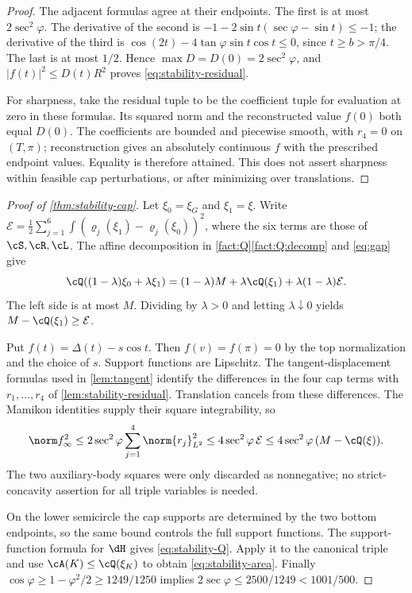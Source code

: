 \begin{proof}
The adjacent formulas agree at their endpoints. The first is at most
$2\sec^2\varphi$. The derivative of the second is
$-1-2\sin t(\sec\varphi-\sin t)\le-1$; the derivative of the third is
$\cos(2t)-4\tan\varphi\sin t\cos t\le0$, since $t\ge b>\pi/4$.
The last is at most $1/2$. Hence $\max D=D(0)=2\sec^2\varphi$, and
$|f(t)|^2\le D(t)R^2$ proves \eqref{eq:stability-residual}.

For sharpness, take the residual tuple to be the coefficient tuple for
evaluation at zero in these formulas. Its squared norm and the reconstructed
value $f(0)$ both equal $D(0)$. The coefficients are bounded and piecewise
smooth, with $r_4=0$ on $(T,\pi)$; reconstruction gives an absolutely
continuous $f$ with the prescribed endpoint values. Equality is therefore
attained. This does not assert sharpness within feasible cap perturbations,
or after minimizing over translations.
\end{proof}

\begin{proof}[Proof of \cref{thm:stability-cap}]
Let $\xi_0=\xi_G$ and $\xi_1=\xi$. Write
$\mathcal E=\frac12\sum_{j=1}^6\int(\varrho_j(\xi_1)-\varrho_j(\xi_0))^2$,
where the six terms are those of $\cS,\cR,\cL$. The affine decomposition
in \cref{fact:Q}\ref{fact:Q:decomp} and \eqref{eq:gap} give
\[
 \cQ((1-\lambda)\xi_0+\lambda\xi_1)
 =(1-\lambda)M+\lambda\cQ(\xi_1)+\lambda(1-\lambda)\mathcal E.
\]
The left side is at most $M$. Dividing by $\lambda>0$ and letting
$\lambda\downarrow0$ yields $M-\cQ(\xi_1)\ge\mathcal E$.

Put $f(t)=\Delta(t)-s\cos t$. Then $f(v)=f(\pi)=0$ by the top normalization
and the choice of $s$. Support functions are Lipschitz. The tangent-displacement
formulas used in \cref{lem:tangent} identify the differences in the four
cap terms with $r_1,\ldots,r_4$ of \cref{lem:stability-residual}. Translation
cancels from these differences. The Mamikon identities supply their square
integrability, so
\[
 \norm f_\infty^2
 \le 2\sec^2\varphi\sum_{j=1}^4\norm{r_j}_{L^2}^2
 \le4\sec^2\varphi\,\mathcal E
 \le4\sec^2\varphi\,(M-\cQ(\xi)).
\]
The two auxiliary-body squares were only discarded as nonnegative; no
strict-concavity assertion for all triple variables is needed.

On the lower semicircle the cap supports are determined by the two bottom
endpoints, so the same bound controls the full support functions. The
support-function formula for $\dH$ gives \eqref{eq:stability-Q}. Apply it to
the canonical triple and use $\cA(K)\le\cQ(\xi_K)$ to obtain
\eqref{eq:stability-area}. Finally
$\cos\varphi\ge1-\varphi^2/2\ge1249/1250$ implies
$2\sec\varphi\le2500/1249<1001/500$.
\end{proof}

